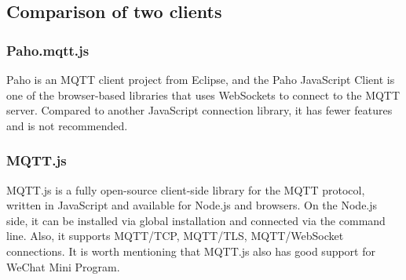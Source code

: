 \documentclass[oneside]{book}
\begin{document}
\subsection*{Comparison of two clients}
\subsubsection*{Paho.mqtt.js}
Paho is an MQTT client project from Eclipse, and the Paho JavaScript Client is one of the browser-based libraries that uses WebSockets to connect to the MQTT server. Compared to another JavaScript connection library, it has fewer features and is not recommended.

\subsubsection*{MQTT.js}
MQTT.js is a fully open-source client-side library for the MQTT protocol, written in JavaScript and available for Node.js and browsers. On the Node.js side, it can be installed via global installation and connected via the command line. Also, it supports MQTT/TCP, MQTT/TLS, MQTT/WebSocket connections. It is worth mentioning that MQTT.js also has good support for WeChat Mini Program.
\end{document}
